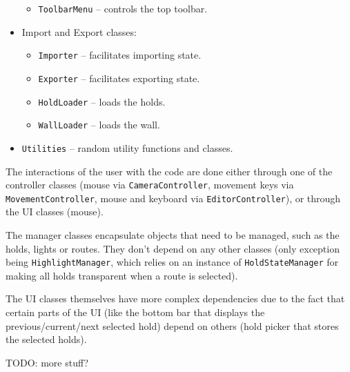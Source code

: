 \begin{itemize}
\begin{itemize}
		\item \verb|ToolbarMenu| -- controls the top toolbar.
	\end{itemize}
	\item Import and Export classes:
	\begin{itemize}
		\item \verb|Importer| -- facilitates importing state.
		\item \verb|Exporter| -- facilitates exporting state.
		\item \verb|HoldLoader| -- loads the holds.
		\item \verb|WallLoader| -- loads the wall.
	\end{itemize}
	\item \verb|Utilities| -- random utility functions and classes.
\end{itemize}

The interactions of the user with the code are done either through one of the controller classes (mouse via \verb|CameraController|, movement keys via \verb|MovementController|, mouse and keyboard via \verb|EditorController|), or through the UI classes (mouse).

The manager classes encapsulate objects that need to be managed, such as the holds, lights or routes.
They don't depend on any other classes (only exception being \verb|HighlightManager|, which relies on an instance of \verb|HoldStateManager| for making all holds transparent when a route is selected).

The UI classes themselves have more complex dependencies due to the fact that certain parts of the UI (like the bottom bar that displays the previous/current/next selected hold) depend on others (hold picker that stores the selected holds).

TODO: more stuff?
